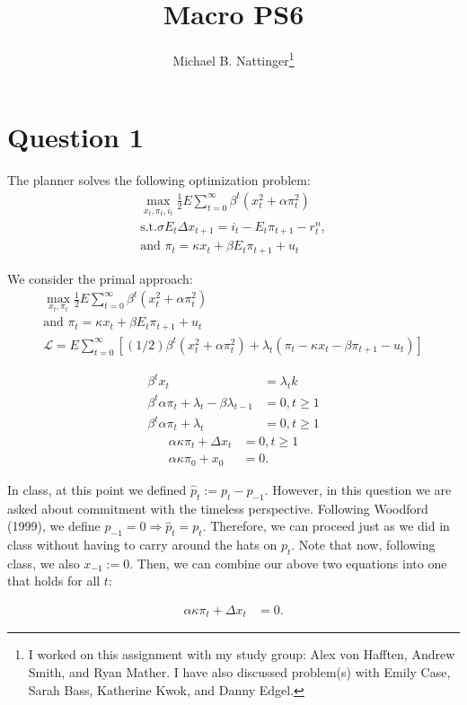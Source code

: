 \documentclass[11pt]{article} %
\title{Macro PS6}
\author{Michael B. Nattinger\footnote{I worked on this assignment with my study group: Alex von Hafften, Andrew Smith, and Ryan Mather. I have also discussed problem(s) with Emily Case, Sarah Bass, Katherine Kwok, and Danny Edgel.}}
\begin{document}
\maketitle
\section{Question 1}
The planner solves the following optimization problem:
\begin{align*}
\max_{x_t,\pi_t,i_t} \frac{1}{2}E\sum_{t=0}^{\infty}\beta^t (x_t^2 + \alpha \pi_t^2) \\
\text{s.t.} \sigma E_t\Delta x_{t+1} = i_t - E_t\pi_{t+1} - r_t^n,\\
\text{and } \pi_t = \kappa x_t + \beta E_t\pi_{t+1} + u_t
\end{align*}

We consider the primal approach:
\begin{align*}
\max_{x_t,\pi_t} \frac{1}{2}E\sum_{t=0}^{\infty}\beta^t (x_t^2 + \alpha \pi_t^2) \\
\text{and } \pi_t = \kappa x_t + \beta E_t\pi_{t+1} + u_t\\
\mathcal{L} = E\sum_{t=0}^{\infty}\left[(1/2)\beta^t (x_t^2 + \alpha \pi_t^2) + \lambda_t(\pi_t - \kappa x_t - \beta \pi_{t+1} - u_t) \right]
\end{align*}

\begin{align*}
\beta^t x_t &= \lambda_t k\\
\beta^t\alpha\pi_t + \lambda_t - \beta \lambda_{t-1} &= 0, t\geq 1\\
\beta^t\alpha\pi_t + \lambda_t &= 0, t\geq 1
\end{align*}
\begin{align*}
\alpha \kappa \pi_t + \Delta x_t &= 0, t\geq 1\\
\alpha \kappa \pi_0 + x_0 &= 0.
\end{align*}

In class, at this point we defined $\hat{p}_t := p_t - p_{-1}$. However, in this question we are asked about commitment with the timeless perspective. Following Woodford (1999), we define $p_{-1} = 0 \Rightarrow \hat{p}_t = p_t.$ Therefore, we can proceed just as we did in class without having to carry around the hats on $p_t$. Note that now, following class, we also $x_{-1}:=0$. Then, we can combine our above two equations into one that holds for all $t$:

\begin{align*}
\alpha \kappa \pi_t + \Delta x_t &= 0.
\end{align*}
\end{document}

